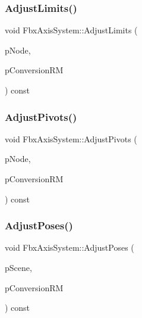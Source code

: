 \subsubsection{\texorpdfstring{Adjust\+Limits()}{AdjustLimits()}}
{\footnotesize\ttfamily void Fbx\+Axis\+System\+::\+Adjust\+Limits (\begin{DoxyParamCaption}\item[{\hyperlink{class_fbx_node}{Fbx\+Node} $\ast$}]{p\+Node,  }\item[{const \hyperlink{class_fbx_matrix}{Fbx\+Matrix} \&}]{p\+Conversion\+RM }\end{DoxyParamCaption}) const\hspace{0.3cm}{\ttfamily [protected]}}

\mbox{\label{class_fbx_axis_system_aab7c9d541191268942f8dbbc3f531150}} 
\subsubsection{\texorpdfstring{Adjust\+Pivots()}{AdjustPivots()}}
{\footnotesize\ttfamily void Fbx\+Axis\+System\+::\+Adjust\+Pivots (\begin{DoxyParamCaption}\item[{\hyperlink{class_fbx_node}{Fbx\+Node} $\ast$}]{p\+Node,  }\item[{const \hyperlink{class_fbx_matrix}{Fbx\+Matrix} \&}]{p\+Conversion\+RM }\end{DoxyParamCaption}) const\hspace{0.3cm}{\ttfamily [protected]}}

\mbox{\label{class_fbx_axis_system_a4547ae0ec09f1c6e15e171e8cb56a7f9}} 
\subsubsection{\texorpdfstring{Adjust\+Poses()}{AdjustPoses()}}
{\footnotesize\ttfamily void Fbx\+Axis\+System\+::\+Adjust\+Poses (\begin{DoxyParamCaption}\item[{\hyperlink{class_fbx_scene}{Fbx\+Scene} $\ast$}]{p\+Scene,  }\item[{const \hyperlink{class_fbx_matrix}{Fbx\+Matrix} \&}]{p\+Conversion\+RM }\end{DoxyParamCaption}) const\hspace{0.3cm}{\ttfamily [protected]}}

